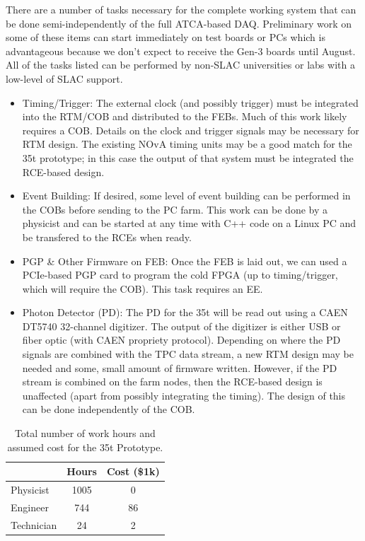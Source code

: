 There are a number of tasks necessary for the complete working system that can be done semi-independently of the full ATCA-based DAQ.  Preliminary work on some of these items can start immediately on test boards or PCs which is advantageous because we don't expect to receive the Gen-3 boards until August.  All of the tasks listed can be performed by non-SLAC universities or labs with a low-level of SLAC support.  
\begin{itemize}
\item Timing/Trigger:  The external clock (and possibly trigger) must be integrated into the RTM/COB and distributed to the FEBs.  Much of this work likely requires a COB.  Details on the clock and trigger signals may be necessary for RTM design.   The existing NOvA timing units may be a good match for the 35t prototype; in this case the output of that system must be integrated the RCE-based design.  
\item Event Building:  If desired, some level of event building can be performed in the COBs before sending to the PC farm.  This work can be done by a physicist and can be started at any time with C++ code on a Linux PC and be transfered to the RCEs when ready.   
\item PGP \& Other Firmware on FEB:    Once the FEB is laid out,  we can used a PCIe-based PGP card to program  the cold FPGA (up to timing/trigger, which will require the COB).  This task requires an EE.    
\item Photon Detector (PD):  The PD for the 35t will be read out using a CAEN DT5740 32-channel digitizer.  The output of the digitizer is either USB or fiber optic (with CAEN propriety protocol).   Depending on where the PD signals are combined with the TPC data stream, a new RTM design may be needed and some, small amount of firmware written.  However, if the PD stream is combined on the farm nodes, then the RCE-based design is unaffected (apart from possibly integrating the timing).  The design of this can be done independently of the COB.  
\end{itemize}


\begin{table}[tbh]
\begin{center}
\begin{tabular}{|l|c|c|}   
\hline \hline 
    & Hours  & Cost (\$1k) \\      
\hline
   Physicist           & 1005 &0 \\ 
   Engineer           & 744&86 \\ 
   Technician        & 24&2\\ 
\hline \hline
\end{tabular}
\caption[]{Total number of work hours and assumed cost for the 35t Prototype.}
\label{tab:labor} 
\end{center}
\end{table}



